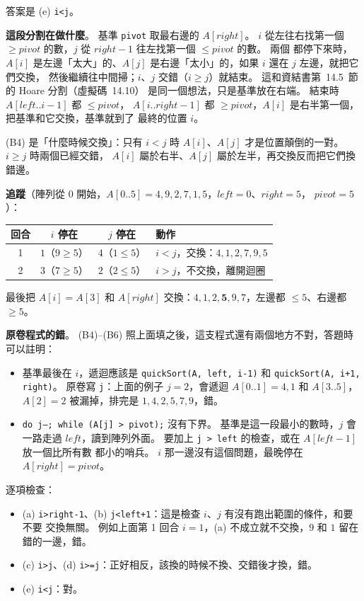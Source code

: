 \begin{pastsoln}
答案是 (e) \texttt{i<j}。

\textbf{這段分割在做什麼}。 基準 \texttt{pivot} 取最右邊的 $A[\mathit{right}]$。 $i$ 從左往右找第一個
$\ge \mathit{pivot}$ 的數，$j$ 從 $\mathit{right} - 1$ 往左找第一個 $\le \mathit{pivot}$ 的數。 兩個
都停下來時，$A[i]$ 是左邊「太大」的、$A[j]$ 是右邊「太小」的，如果 $i$ 還在 $j$ 左邊，就把它們交換，
然後繼續往中間掃；$i$、$j$ 交錯（$i \ge j$）就結束。 這和資結書第~14.5~節的 Hoare 分割（虛擬碼~14.10）
是同一個想法，只是基準放在右端。 結束時 $A[\mathit{left}..i-1]$ 都 $\le \mathit{pivot}$，
$A[i..\mathit{right}-1]$ 都 $\ge \mathit{pivot}$，$A[i]$ 是右半第一個，把基準和它交換，基準就到了
最終的位置 $i$。

(B4) 是「什麼時候交換」：只有 $i < j$ 時 $A[i]$、$A[j]$ 才是位置顛倒的一對。 $i \ge j$ 時兩個已經交錯，
$A[i]$ 屬於右半、$A[j]$ 屬於左半，再交換反而把它們換錯邊。

\textbf{追蹤}（陣列從 $0$ 開始，$A[0..5] = 4, 9, 2, 7, 1, 5$，$\mathit{left} = 0$、$\mathit{right} = 5$，
$\mathit{pivot} = 5$）：
\begin{center}
\begin{tabular}{cccl}
\toprule
回合 & $i$ 停在 & $j$ 停在 & 動作 \\
\midrule
1 & $1$（$9 \ge 5$） & $4$（$1 \le 5$） & $i < j$，交換：$4, 1, 2, 7, 9, 5$ \\
2 & $3$（$7 \ge 5$） & $2$（$2 \le 5$） & $i > j$，不交換，離開迴圈 \\
\bottomrule
\end{tabular}
\end{center}
最後把 $A[i] = A[3]$ 和 $A[\mathit{right}]$ 交換：$4, 1, 2, \mathbf{5}, 9, 7$，左邊都 $\le 5$、右邊都
$\ge 5$。

\textbf{原卷程式的錯}。 (B4)--(B6) 照上面填之後，這支程式還有兩個地方不對，答題時可以註明：
\begin{itemize}
\item 基準最後在 $i$，遞迴應該是 \texttt{quickSort(A, left, i-1)} 和 \texttt{quickSort(A, i+1, right)}。
原卷寫 \texttt{j}：上面的例子 $j = 2$，會遞迴 $A[0..1] = 4, 1$ 和 $A[3..5]$，$A[2] = 2$ 被漏掉，排完是
$1, 4, 2, 5, 7, 9$，錯。
\item \texttt{do j--; while (A[j] > pivot);} 沒有下界。 基準是這一段最小的數時，$j$ 會一路走過
$\mathit{left}$，讀到陣列外面。 要加上 \texttt{j > left} 的檢查，或在 $A[\mathit{left}-1]$ 放一個比所有數
都小的哨兵。 $i$ 那一邊沒有這個問題，最晚停在 $A[\mathit{right}] = \mathit{pivot}$。
\end{itemize}

逐項檢查：
\begin{itemize}
\item (a) \texttt{i>right-1}、(b) \texttt{j<left+1}：這是檢查 $i$、$j$ 有沒有跑出範圍的條件，和要不要
交換無關。 例如上面第 1 回合 $i = 1$，(a) 不成立就不交換，$9$ 和 $1$ 留在錯的一邊，錯。
\item (c) \texttt{i>j}、(d) \texttt{i>=j}：正好相反，該換的時候不換、交錯後才換，錯。
\item (e) \texttt{i<j}：對。
\end{itemize}
\end{pastsoln}
